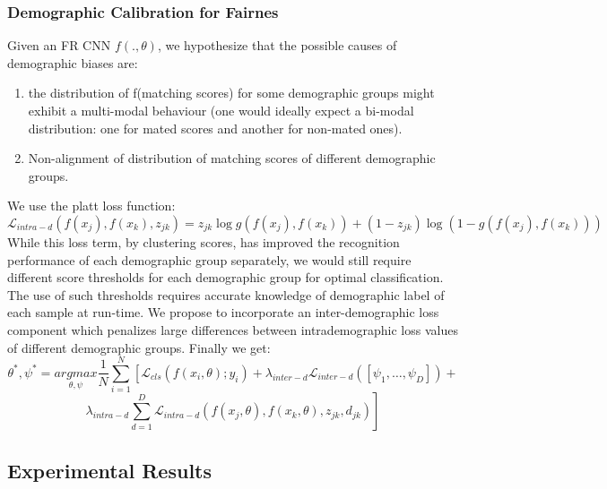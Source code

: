 \documentclass[12pt]{article}
\begin{document}
\subsubsection{Demographic Calibration for Fairnes}
Given an FR CNN
$f(., \theta)$, we hypothesize that the possible causes of demographic biases are:
\begin{enumerate}
  \item the distribution of f(matching scores) for some demographic groups might exhibit a multi-modal behaviour (one would ideally expect a bi-modal distribution: one for mated scores and another for non-mated ones).
  \item Non-alignment of distribution of matching scores of different demographic groups.
\end{enumerate} 
We use the platt loss function:
\[\mathcal{L}_{intra-d}(f(x_j), f(x_k), z_{jk})=z_{jk}\log g(f(x_j),f(x_k))+(1-z_{jk})\log (1-g(f(x_j),f(x_k)))\]
While this loss term, by clustering scores, has improved the
recognition performance of each demographic group separately, we would still require different score thresholds for
each demographic group for optimal classification. The use
of such thresholds requires accurate knowledge of demographic label of each sample at run-time. We propose to incorporate an inter-demographic loss component which penalizes large differences between intrademographic loss values of different demographic groups. Finally we get:
\[\theta^*,\psi^*=\underset{\theta,\psi}{argmax}\dfrac{1}{N}\sum_{i=1}^N\left[\mathcal{L}_{cls}(f(x_i,\theta);y_i)+\lambda_{inter-d}\mathcal{L}_{inter-d}(\left[\psi_1,\ldots,\psi_D\right])+\right.\]
\[\left.\lambda_{intra-d}\sum_{d=1}^D\mathcal{L}_{intra-d}(f(x_j , \theta), f(x_k, \theta), z_{jk}, d_{jk})\right]\]
\subsection{Experimental Results}
\end{document}
